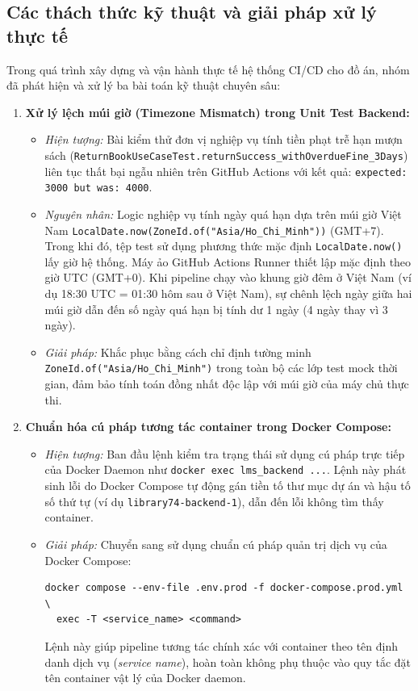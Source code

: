 \subsection{Các thách thức kỹ thuật và giải pháp xử lý thực tế}

Trong quá trình xây dựng và vận hành thực tế hệ thống CI/CD cho đồ án, nhóm đã phát hiện và xử lý ba bài toán kỹ thuật chuyên sâu:

\begin{enumerate}
    \item \textbf{Xử lý lệch múi giờ (Timezone Mismatch) trong Unit Test Backend:}
    \begin{itemize}[noitemsep]
        \item \textit{Hiện tượng:} Bài kiểm thử đơn vị nghiệp vụ tính tiền phạt trễ hạn mượn sách (\texttt{ReturnBookUseCaseTest.}\allowbreak \texttt{returnSuccess\_}\allowbreak \texttt{withOverdueFine\_3Days}) liên tục thất bại ngẫu nhiên trên GitHub Actions với kết quả: \texttt{expected: 3000 but was: 4000}.
        \item \textit{Nguyên nhân:} Logic nghiệp vụ tính ngày quá hạn dựa trên múi giờ Việt Nam \texttt{LocalDate.now(}\allowbreak \texttt{ZoneId.of(}\allowbreak \texttt{"Asia/}\allowbreak \texttt{Ho\_Chi\_Minh"))} (GMT+7). Trong khi đó, tệp test sử dụng phương thức mặc định \texttt{LocalDate.now()} lấy giờ hệ thống. Máy ảo GitHub Actions Runner thiết lập mặc định theo giờ UTC (GMT+0). Khi pipeline chạy vào khung giờ đêm ở Việt Nam (ví dụ 18:30 UTC = 01:30 hôm sau ở Việt Nam), sự chênh lệch ngày giữa hai múi giờ dẫn đến số ngày quá hạn bị tính dư 1 ngày (4 ngày thay vì 3 ngày).
        \item \textit{Giải pháp:} Khắc phục bằng cách chỉ định tường minh \texttt{ZoneId.of(}\allowbreak \texttt{"Asia/}\allowbreak \texttt{Ho\_Chi\_Minh")} trong toàn bộ các lớp test mock thời gian, đảm bảo tính toán đồng nhất độc lập với múi giờ của máy chủ thực thi.
    \end{itemize}

    \item \textbf{Chuẩn hóa cú pháp tương tác container trong Docker Compose:}
    \begin{itemize}[noitemsep]
        \item \textit{Hiện tượng:} Ban đầu lệnh kiểm tra trạng thái sử dụng cú pháp trực tiếp của Docker Daemon như \texttt{docker exec lms\_backend ...}. Lệnh này phát sinh lỗi do Docker Compose tự động gán tiền tố thư mục dự án và hậu tố số thứ tự (ví dụ \texttt{library74-backend-1}), dẫn đến lỗi không tìm thấy container.
        \item \textit{Giải pháp:} Chuyển sang sử dụng chuẩn cú pháp quản trị dịch vụ của Docker Compose:
\begin{verbatim}
docker compose --env-file .env.prod -f docker-compose.prod.yml \
  exec -T <service_name> <command>
\end{verbatim}
        Lệnh này giúp pipeline tương tác chính xác với container theo tên định danh dịch vụ (\textit{service name}), hoàn toàn không phụ thuộc vào quy tắc đặt tên container vật lý của Docker daemon.
    \end{itemize}


\end{enumerate}

